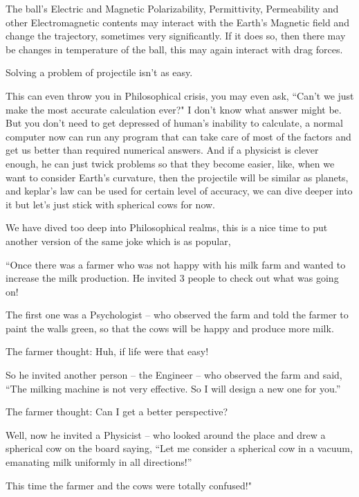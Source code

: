 \documentclass[12pt,a4paper,darkblue]{memoir}
\begin{document}
The ball's Electric and Magnetic Polarizability, Permittivity, Permeability and other Electromagnetic contents may interact with the Earth's Magnetic field and change the trajectory, sometimes very significantly. If it does so, then there may be changes in temperature of the ball, this may again interact with drag forces. 

Solving a problem of projectile isn't as easy.

This can even throw you in Philosophical crisis, you may even ask, ``Can't we just make the most accurate calculation ever?" I don't know what answer might be. But you don't need to get depressed of human's inability to calculate, a normal computer now can run any program that can take care of most of the factors and get us better than required numerical answers. And if a physicist is clever enough, he can just twick problems so that they become easier, like, when we want to consider Earth's curvature, then the projectile will be similar as planets, and keplar's law can be used for certain level of accuracy, we can dive deeper into it but let's just stick with spherical cows for now. 


We have dived too deep into Philosophical realms, this is a nice time to put another version of the same joke which is as popular,

``Once there was a farmer who was not happy with his milk farm and wanted to increase the milk production. He invited 3 people to check out what was going on!

The first one was a Psychologist – who observed the farm and told the farmer to paint the walls green, so that the cows will be happy and produce more milk.

The farmer thought: Huh, if life were that easy!

So he invited another person – the Engineer – who observed the farm and said, “The milking machine is not very effective. So I will design a new one for you.”

The farmer thought: Can I get a better perspective?

Well, now he invited a Physicist – who looked around the place and drew a spherical cow on the board saying, “Let me consider a spherical cow in a vacuum, emanating milk uniformly in all directions!”

This time the farmer and the cows were totally confused!" 
\end{document}
